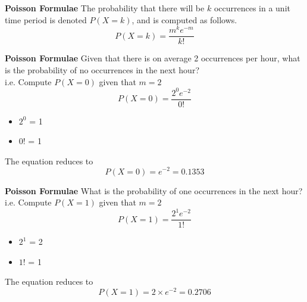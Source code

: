 \documentclass[a4]{beamer}
\begin{document}
{
\textbf{Poisson Formulae}
The probability that there will be $k$ occurrences in a unit time period is denoted $P(X=k)$, and is computed as follows.
\Large
\[ P(X = k)=\frac{m^k e^{-m}}{k!} \]

}
{
\textbf{Poisson Formulae}
Given that there is on average 2 occurrences per hour, what is the probability of no occurrences in the next hour? \\ i.e. Compute $P(X=0)$ given that $m=2$
\Large
\[ P(X = 0)=\frac{2^0 e^{-2}}{0!} \]
\normalsize
\begin{itemize}
\item $2^0$ = 1
\item $0!$ = 1
\end{itemize}
The equation reduces to
\[ P(X = 0)=e^{-2} = 0.1353\]
}
{
\textbf{Poisson Formulae}
What is the probability of one occurrences in the next hour? \\ i.e. Compute $P(X=1)$ given that $m=2$
\Large
\[ P(X = 1)=\frac{2^1 e^{-2}}{1!} \]
\normalsize
\begin{itemize}
\item $2^1$ = 2
\item $1!$ = 1
\end{itemize}
The equation reduces to
\[ P(X = 1) = 2 \times e^{-2} = 0.2706\]
}
\end{document}
